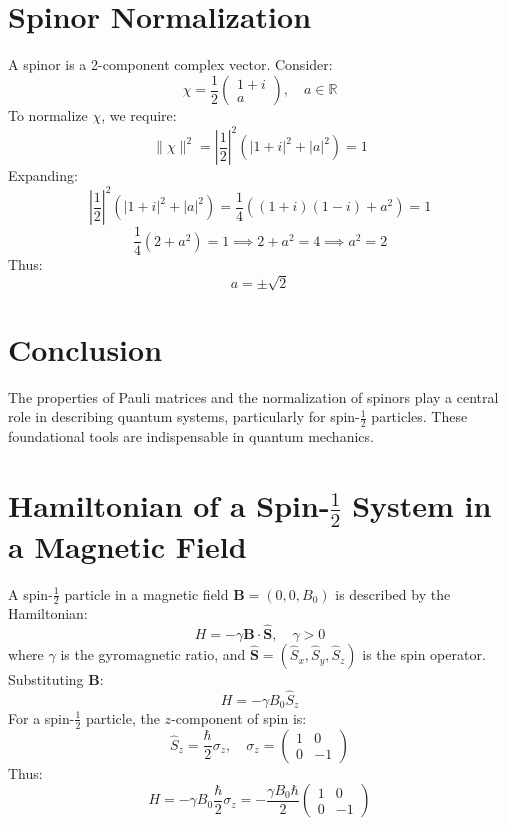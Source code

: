 \documentclass[a4paper,12pt]{article}
\begin{document}
\begin{multicols}{2}
\section*{Spinor Normalization}
A spinor is a 2-component complex vector. Consider:
\[
\chi = \frac{1}{2}\begin{pmatrix} 1+i \\ a \end{pmatrix}, \quad a \in \mathbb{R}
\]
To normalize $\chi$, we require:
\[
\|\chi\|^2 = \left|\frac{1}{2}\right|^2 (|1+i|^2 + |a|^2) = 1
\]
Expanding:
\[
\left|\frac{1}{2}\right|^2 (|1+i|^2 + |a|^2) = \frac{1}{4}((1+i)(1-i) + a^2) = 1
\]
\[
\frac{1}{4}(2 + a^2) = 1 \implies 2 + a^2 = 4 \implies a^2 = 2
\]
Thus:
\[
a = \pm \sqrt{2}
\]

\section*{Conclusion}
The properties of Pauli matrices and the normalization of spinors play a central role in describing quantum systems, particularly for spin-$\frac{1}{2}$ particles. These foundational tools are indispensable in quantum mechanics.


\section*{Hamiltonian of a Spin-$\frac{1}{2}$ System in a Magnetic Field}
A spin-$\frac{1}{2}$ particle in a magnetic field $\mathbf{B} = (0, 0, B_0)$ is described by the Hamiltonian:
\[
H = -\gamma \mathbf{B} \cdot \hat{\mathbf{S}}, \quad \gamma > 0
\]
where $\gamma$ is the gyromagnetic ratio, and $\hat{\mathbf{S}} = (\hat{S}_x, \hat{S}_y, \hat{S}_z)$ is the spin operator. Substituting $\mathbf{B}$:
\[
H = -\gamma B_0 \hat{S}_z
\]
For a spin-$\frac{1}{2}$ particle, the $z$-component of spin is:
\[
\hat{S}_z = \frac{\hbar}{2} \sigma_z, \quad \sigma_z = \begin{pmatrix} 1 & 0 \\ 0 & -1 \end{pmatrix}
\]
Thus:
\[
H = -\gamma B_0 \frac{\hbar}{2} \sigma_z = -\frac{\gamma B_0 \hbar}{2} \begin{pmatrix} 1 & 0 \\ 0 & -1 \end{pmatrix}
\]


\end{multicols}
\end{document}
